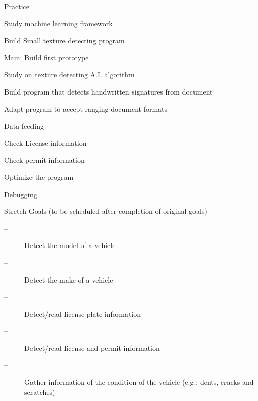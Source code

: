 \documentclass[onecolumn, draftclsnofoot,10pt, compsoc]{IEEEtran}
\begin{document}
Practice
\begin{description}
	\color{green}
	\item[--]Study machine learning framework
	\color{yellow}
	\item[--]Build Small texture detecting program
\end{description}

\color{black}
Main: Build first prototype
\begin{description}
	\color{Orange}
	\item[--]Study on texture detecting A.I. algorithm
	\color{blue}
	\item[--]Build program that detects handwritten signatures from document
	\color{purple}
	\item[--]Adapt program to accept ranging document formats
	\begin{description}
		\color{black}
		\item[--]Data feeding
		\item[--]Check License information
		\item[--]Check permit information
	\end{description}
	\color{brown}
	\item[--]Optimize the program
	\begin{description}
		\color{black}
		\item[--]Debugging
	\end{description}
\end{description}
Stretch Goals (to be scheduled after completion of original goals)
\begin{description}
	\item[--]Detect the model of a vehicle
	\item[--]Detect the make of a vehicle
	\item[--]Detect/read license plate information
	\item[--]Detect/read license and permit information
	\item[--]Gather information of the condition of the vehicle (e.g.: dents, cracks and scratches)
\end{description}
\end{document}
